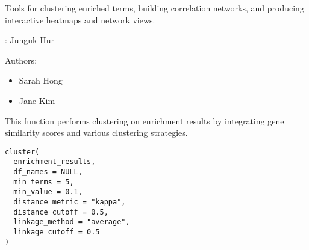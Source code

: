 \documentclass[a4paper]{book}
\begin{document}
%
\begin{Description}
Tools for clustering enriched terms, building correlation networks,
and producing interactive heatmaps and network views.
\end{Description}
%
\begin{Author}
: Junguk Hur 

Authors:
\begin{itemize}

\item{} Sarah Hong 
\item{} Jane Kim 

\end{itemize}


\end{Author}
%
\begin{Description}
This function performs clustering on enrichment results by integrating
gene similarity scores and various clustering strategies.
\end{Description}
%
\begin{Usage}
\begin{verbatim}
cluster(
  enrichment_results,
  df_names = NULL,
  min_terms = 5,
  min_value = 0.1,
  distance_metric = "kappa",
  distance_cutoff = 0.5,
  linkage_method = "average",
  linkage_cutoff = 0.5
)
\end{verbatim}
\end{Usage}
%
\end{document}
